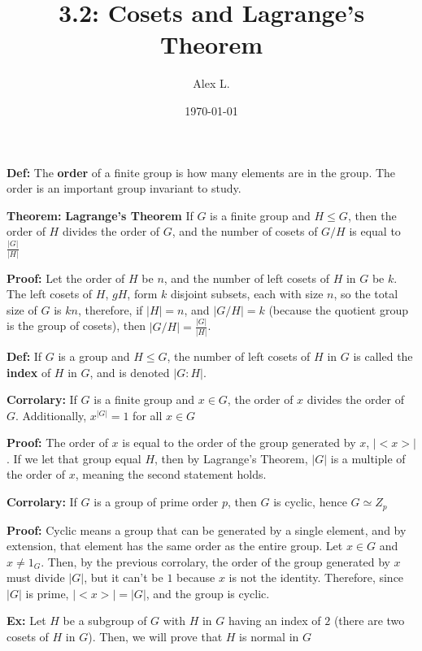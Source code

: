 \documentclass{article}
\title{3.2: Cosets and Lagrange's Theorem}
\author{Alex L.}
\date{\today}
\begin{document}
\maketitle

\textbf{Def:} The \textbf{order} of a finite group is how many elements are in the group. The order is an important group invariant to study.

\textbf{Theorem:} \textbf{Lagrange's Theorem} If $G$ is a finite group and $H \leq G$, then the order of $H$ divides the order of $G$, and the number of cosets of $G/H$ is equal to $\frac{\vert G \vert}{\vert H \vert}$

\textbf{Proof:} Let the order of $H$ be $n$, and the number of left cosets of $H$ in $G$ be $k$. The left cosets of $H$, $gH$, form $k$ disjoint subsets, each with size $n$, so the total size of $G$ is $kn$, therefore, if $\vert H \vert = n$, and $\vert G/H \vert = k$ (because the quotient group is the group of cosets), then $\vert G/H \vert = \frac{\vert G\vert}{\vert H\vert}$.

\textbf{Def:} If $G$ is a group and $H \leq G$, the number of left cosets of $H$ in $G$ is called the \textbf{index} of $H$ in $G$, and is denoted $\vert G:H\vert$.

\textbf{Corrolary:} If $G$ is a finite group and $x \in G$, the order of $x$ divides the order of $G$. Additionally, $x^{\vert G\vert} = 1$ for all $x \in G$

\textbf{Proof:} The order of $x$ is equal to the order of the group generated by $x$, $\vert <x> \vert$. If we let that group equal $H$, then by Lagrange's Theorem, $\vert G \vert$ is a multiple of the order of $x$, meaning the second statement holds.

\textbf{Corrolary:} If $G$ is a group of prime order $p$, then $G$ is cyclic, hence $G \simeq Z_p$

\textbf{Proof:} Cyclic means a group that can be generated by a single element, and by extension, that element has the same order as the entire group. Let $x \in G$ and $x \neq 1_G$. Then, by the previous corrolary, the order of the group generated by $x$ must divide $\vert G\vert$, but it can't be $1$ because $x$ is not the identity. Therefore, since $\vert G \vert$ is prime, $\vert <x> \vert = \vert G \vert$, and the group is cyclic. 

\textbf{Ex:} Let $H$ be a subgroup of $G$ with $H$ in $G$ having an index of $2$ (there are two cosets of $H$ in $G$). Then, we will prove that $H$ is normal in $G$
\end{document}
